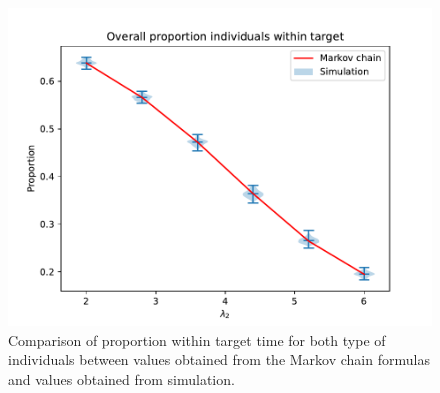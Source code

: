\begin{figure}[H]
    \centering
    \includegraphics[width=.8\textwidth]{imgs/proportion_within_target_comparison/proportion_overall.pdf}
    \caption{
        Comparison of proportion within target time for both type of 
        individuals between values obtained from the Markov chain formulas 
        and values obtained from simulation. 
    }
    \label{fig:markov_vs_des_proportion_comparison_overall}
\end{figure}
